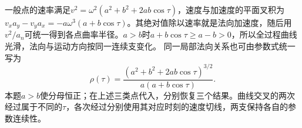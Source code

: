 \documentclass[UTF8,fontset=fandol,a4paper,11pt]{ctexart}
\begin{document}
一般点的速率满足$v^2=\omega^2(a^2+b^2+2ab\cos\tau)$，速度与加速度的平面叉积为$v_xa_y-v_ya_x=-a\omega^3(a+b\cos\tau)$。其绝对值除以速率就是法向加速度，随后用$v^2/a_n$可统一得到各点曲率半径。$a>b$时$a+b\cos\tau\ge a-b>0$，所以全过程曲线光滑，法向与运动方向按同一连续支变化。
同一局部法向关系也可由参数式统一写为
\[
\rho(\tau)=
\frac{(a^2+b^2+2ab\cos\tau)^{3/2}}
{a(a+b\cos\tau)}.
\]
本题$a>b$使分母恒正；在上述三类点代入，分别恢复三个结果。曲线交叉的两次经过属于不同的$\tau$，各次经过分别使用其对应时刻的速度切线，两支保持各自的参数连续性。
\begin{center}\begin{minipage}{.98\linewidth}\centering
{}
\end{minipage}
\end{center}
\end{document}
